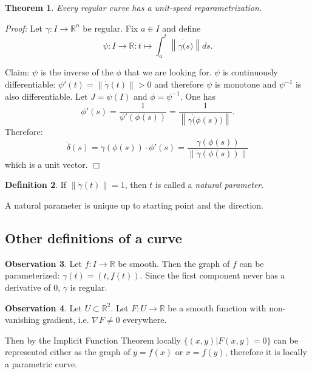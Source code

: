 \documentclass[a4paper,11pt,notitlepage,fullpage]{paper}
\theoremstyle{plain}
\newtheorem{thm}{Theorem}[section] %
\theoremstyle{definition}
\newtheorem{defn}[thm]{Definition} %
\newtheorem{obsv}[thm]{Observation}
\begin{document}
\begin{thm}
Every regular curve has a unit-speed reparametrization.
\end{thm}
\emph{Proof:} Let $\gamma: I \to \mathbb R^n$ be regular. Fix $a \in I$ and define
\begin{equation*}
\psi: I \to \mathbb R: t \mapsto \int_a^t \left\|\gamma\dot(s)\right\| ds.
\end{equation*}

Claim: $\psi$ is the inverse of the $\phi$ that we are looking for.
$\psi$ is continuously differentiable: $\psi'(t) = \left\|\dot\gamma(t)\right\| > 0$ and therefore $\psi$ is monotone and $\psi^{-1}$ is also differentiable.
Let $J = \psi(I)$ and $\phi = \psi^{-1}$. One has
\begin{equation*}
\phi'(s) = \frac{1}{\psi'(\phi(s))} = \frac{1}{\left\|\gamma\dot(\phi(s))\right\|}.
\end{equation*}
Therefore: 
\begin{equation*}
\dot\delta(s) = \dot\gamma(\phi(s)) \cdot \phi'(s) = \frac{\dot\gamma(\phi(s))}{\left\|\dot\gamma(\phi(s))\right\|}
\end{equation*}
which is a unit vector. \hfill $\Box$


\begin{defn}
If $\left\|\dot\gamma(t)\right\| = 1$, then $t$ is called a \emph{natural parameter}.

A natural parameter is unique up to starting point and the direction.
\end{defn}


\subsection{Other definitions of a curve}


\begin{obsv}
Let $f: I \to \mathbb R$ be smooth. Then the graph of $f$ can be parameterized: $\gamma(t) = (t, f(t))$. Since the first component never has a derivative of $0$, $\gamma$ is regular.
\end{obsv}

\begin{obsv}
Let $U \subset \mathbb R^2$. Let $F: U \to \mathbb R$ be a smooth function with non-vanishing gradient, i.e. $\nabla F \neq 0$ everywhere.

Then by the Implicit Function Theorem locally $\{(x,y)|F(x,y) = 0\}$ can be represented either as the graph of $y = f(x)$ or $x = f(y)$, therefore it is locally a parametric curve.
\end{obsv}
\end{document}
